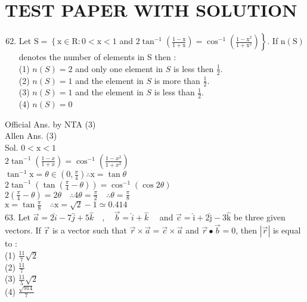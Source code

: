 \documentclass[10pt]{article}
\begin{document}
\section*{TEST PAPER WITH SOLUTION}
\begin{enumerate}
  \setcounter{enumi}{61}
  \item Let \(\mathrm{S}=\left\{\mathrm{x} \in \mathrm{R}: 0<\mathrm{x}<1\right.\) and \(\left.2 \tan ^{-1}\left(\frac{1-\mathrm{x}}{1+\mathrm{x}}\right)=\cos ^{-1}\left(\frac{1-\mathrm{x}^{2}}{1+\mathrm{x}^{2}}\right)\right\}\). If \(\mathrm{n}(\mathrm{S})\) denotes the number of elements in S then :\\
(1) \(n(S)=2\) and only one element in \(S\) is less then \(\frac{1}{2}\).\\
(2) \(n(S)=1\) and the element in \(S\) is more than \(\frac{1}{2}\).\\
(3) \(n(S)=1\) and the element in \(S\) is less than \(\frac{1}{2}\).\\
(4) \(n(S)=0\)
\end{enumerate}

Official Ans. by NTA (3)\\
Allen Ans. (3)\\
Sol. \(0<\mathrm{x}<1\)\\
\(2 \tan ^{-1}\left(\frac{1-x}{1+x}\right)=\cos ^{-1}\left(\frac{1-x^{2}}{1+x^{2}}\right)\)\\
\(\tan ^{-1} \mathrm{x}=\theta \in\left(0, \frac{\pi}{4}\right) \therefore \mathrm{x}=\tan \theta\)\\
\(2 \tan ^{-1}\left(\tan \left(\frac{\pi}{4}-\theta\right)\right)=\cos ^{-1}(\cos 2 \theta)\)\\
\(2\left(\frac{\pi}{4}-\theta\right)=2 \theta \quad \therefore 4 \theta=\frac{\pi}{2} \quad \therefore \theta=\frac{\pi}{8}\)\\
\(\mathrm{x}=\tan \frac{\pi}{8} \quad \therefore \mathrm{x}=\sqrt{2}-1 \simeq 0.414\)\\
63. Let \(\vec{a}=2 \hat{i}-7 \hat{j}+5 \hat{k} \quad, \quad \vec{b}=\hat{i}+\hat{k} \quad\) and \(\overrightarrow{\mathrm{c}}=\hat{\mathrm{i}}+2 \hat{\mathrm{j}}-3 \hat{\mathrm{k}}\) be three given vectors. If \(\overrightarrow{\mathrm{r}}\) is a vector such that \(\vec{r} \times \vec{a}=\vec{c} \times \vec{a}\) and \(\vec{r} \bullet \vec{b}=0\), then \(|\vec{r}|\) is equal to :\\
(1) \(\frac{11}{7} \sqrt{2}\)\\
(2) \(\frac{11}{7}\)\\
(3) \(\frac{11}{5} \sqrt{2}\)\\
(4) \(\frac{\sqrt{914}}{7}\)
\end{document}
